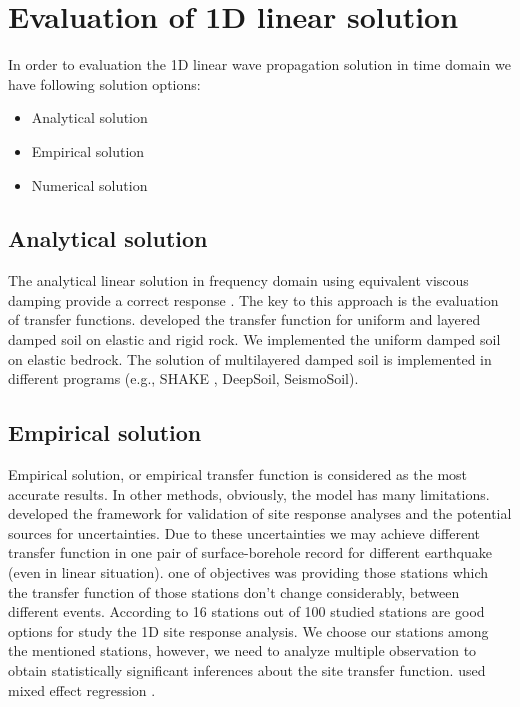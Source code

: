 \newpage
\section{Evaluation of 1D linear solution}
\noindent
In order to evaluation the 1D linear wave propagation solution in time domain we have following solution options:\\

\begin{itemize}
  \item Analytical solution
  \item Empirical solution
  \item Numerical solution
\end{itemize}


\subsection{Analytical solution}

The analytical linear solution in frequency domain using equivalent viscous damping provide a correct response \citep{Stewart2008}. The key to this approach is the evaluation of transfer functions. \citet{Kramer1996} developed the transfer function for uniform and layered damped soil on elastic and rigid rock. We implemented the uniform damped soil on elastic bedrock. The solution of multilayered damped soil is implemented in different programs (e.g., SHAKE \citep{Schnabel1972}, DeepSoil, SeismoSoil).  

\subsection{Empirical solution}
Empirical solution, or empirical transfer function is considered as the most accurate results. In other methods, obviously, the model has many limitations. \citet{Bradley2011} developed the framework for validation of site response analyses and the potential sources for uncertainties. Due to these uncertainties we may achieve different transfer function in one pair of surface-borehole record for different earthquake (even in linear situation). one of \citet{Thomson2012} objectives was providing those stations which the transfer function of those stations don't change considerably, between different events. According to \citet{Thomson2012} 16 stations out of 100 studied stations are good options for study the 1D site response analysis. We choose our stations among the mentioned stations, however, we need to analyze multiple observation to obtain statistically significant inferences about the site transfer function. \citet{Kaklamanos2013} used mixed effect regression \citep{Pinheiro2006}.

